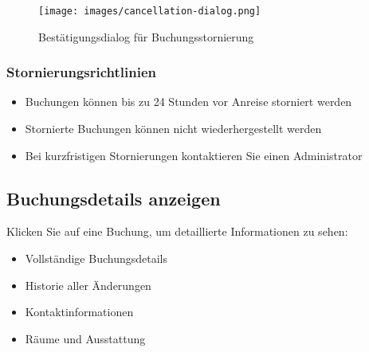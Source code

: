 \begin{figure}[H]
    \centering
    \texttt{[image: images/cancellation-dialog.png]}
    \caption{Bestätigungsdialog für Buchungsstornierung}
    \label{fig:cancellation}
\end{figure}

\subsubsection{Stornierungsrichtlinien}

\begin{itemize}
    \item Buchungen können bis zu 24 Stunden vor Anreise storniert werden
    \item Stornierte Buchungen können nicht wiederhergestellt werden
    \item Bei kurzfristigen Stornierungen kontaktieren Sie einen Administrator
\end{itemize}

\subsection{Buchungsdetails anzeigen}

Klicken Sie auf eine Buchung, um detaillierte Informationen zu sehen:

\begin{itemize}
    \item Vollständige Buchungsdetails
    \item Historie aller Änderungen
    \item Kontaktinformationen
    \item Räume und Ausstattung
\end{itemize}

\newpage